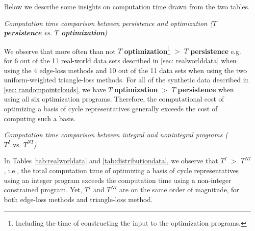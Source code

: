 Below we describe some insights on computation time drawn from the two tables. 





\emph{Computation time comparison between persistence and optimization (\textbf{$T$ persistence} vs. \textbf{$T$ optimization})}

We observe that more often than not $T$ \textbf{optimization}\footnote{Including the time of constructing the input to the optimization programs.} $>$ $T$ \textbf{persistence} e.g. for 6 out of the 11 real-world data sets described in \se \ref{sec: realworlddata} when using the 4 edge-loss methods and 10 out of the 11 data sets when using the two uniform-weighted triangle-loss methods. For all of the synthetic data described in \se \ref{sec: randompointclouds}, we have $T$ \textbf{optimization} $>$ $T$ \textbf{persistence} when using all six optimization programs. 
Therefore, the computational cost of optimizing a basis of cycle representatives generally exceeds the cost of computing such a basis.

\emph{Computation time comparison between integral and nonintegral programs ($T^I \text{ vs. } T^{NI}$)} 

In Tables \ref{tab:realworldata} and \ref{tab:distributiondata}, we observe that $T^I$ $>$ $T^{NI}$, i.e., the total computation time of optimizing a basis of cycle representatives using an integer program exceeds the computation time using a non-integer constrained program. Yet, $T^I$ and $T^{NI}$ are on the same order of magnitude, for both edge-loss methods and triangle-loss method.  


